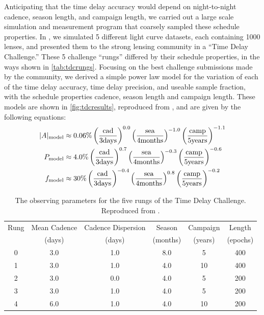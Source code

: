 Anticipating that the time delay accuracy would depend on night-to-night cadence, season length, and campaign length, we carried out a large scale simulation and measurement program that coarsely sampled these schedule properties. In \citet{LiaoEtal2015}, we simulated 5 different light curve datasets, each containing 1000 lenses, and presented them to the strong lensing community in a ``Time Delay Challenge.'' These 5 challenge ``rungs'' differed by their schedule properties, in the ways shown in \autoref{tab:tdcrungs}. Focusing on the best challenge submissions made by the community, we derived a simple power law model for the variation of each of the time delay accuracy, time delay precision, and useable sample fraction, with the schedule properties cadence, season length and campaign length. These models are shown in \autoref{fig:tdcresults}, reproduced from \citet{LiaoEtal2015}, and are given by the following equations:
\begin{align}
|A|_{\rm model} &\approx 0.06\% \left(\frac{\rm cad} {\rm 3 days}  \right)^{0.0}
                          \left(\frac{\rm sea}  {\rm 4 months}\right)^{-1.0}
                          \left(\frac{\rm camp}{\rm 5 years} \right)^{-1.1} \notag \\
  P_{\rm model} &\approx 4.0\% \left(\frac{\rm cad} {\rm 3 days}  \right)^{ 0.7}
                         \left(\frac{\rm sea}  {\rm 4 months}\right)^{-0.3}
                         \left(\frac{\rm camp}{\rm 5 years} \right)^{-0.6} \notag \\
  f_{\rm model} &\approx 30\% \left(\frac{\rm cad} {\rm 3 days}  \right)^{-0.4}
                        \left(\frac{\rm sea}  {\rm 4 months}\right)^{ 0.8}
                        \left(\frac{\rm camp}{\rm 5 years} \right)^{-0.2} \notag
\end{align}

\begin{table}
\begin{center}
\capstart
\begin{tabular}{cccccc} \hline\hline
  Rung &  Mean Cadence & Cadence Dispersion & Season   & Campaign & Length   \\
       &  (days)       & (days)             & (months) & (years)  & (epochs) \\ \hline
  0    &    3.0        &   1.0              &   8.0    &    5     & 400      \\
  1    &    3.0        &   1.0              &   4.0    &    10    & 400      \\
  2    &    3.0        &   0.0              &   4.0    &    5     & 200      \\
  3    &    3.0        &   1.0              &   4.0    &    5     & 200      \\
  4    &    6.0        &   1.0              &   4.0    &    10    & 200      \\
\hline\hline
\end{tabular}
\end{center}
\caption{The observing parameters for the five rungs of the Time Delay
Challenge. Reproduced from \citet{LiaoEtal2015}.\label{tab:tdcrungs}}
\end{table}

